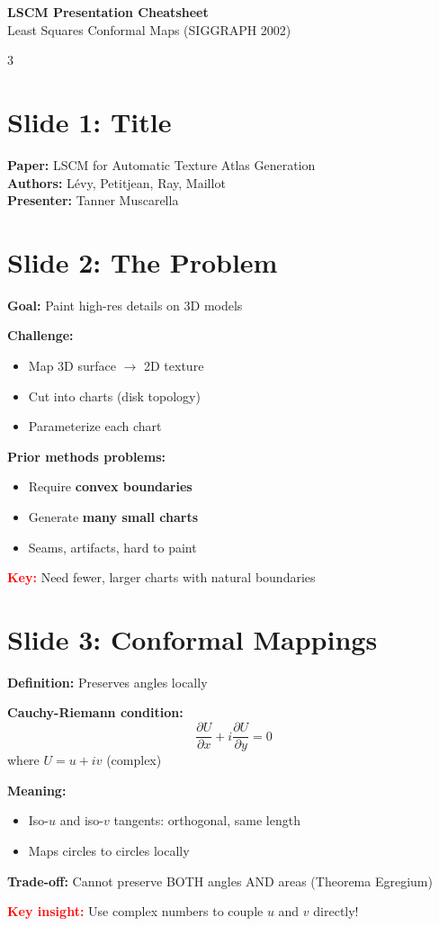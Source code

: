 \documentclass[10pt,landscape]{article}
\newcommand{\slide}[1]{\section*{Slide #1}}
\begin{document}
\begin{center}
\Large\textbf{LSCM Presentation Cheatsheet}\\
\normalsize Least Squares Conformal Maps (SIGGRAPH 2002)
\end{center}

\begin{multicols}{3}
\small

\slide{1: Title}
\textbf{Paper:} LSCM for Automatic Texture Atlas Generation\\
\textbf{Authors:} Lévy, Petitjean, Ray, Maillot\\
\textbf{Presenter:} Tanner Muscarella

\slide{2: The Problem}
\textbf{Goal:} Paint high-res details on 3D models

\textbf{Challenge:}
\begin{itemize}
\item Map 3D surface $\rightarrow$ 2D texture
\item Cut into charts (disk topology)
\item Parameterize each chart
\end{itemize}

\textbf{Prior methods problems:}
\begin{itemize}
\item Require \textbf{convex boundaries}
\item Generate \textbf{many small charts}
\item Seams, artifacts, hard to paint
\end{itemize}

\textcolor{red}{\textbf{Key:}} Need fewer, larger charts with natural boundaries

\slide{3: Conformal Mappings}
\textbf{Definition:} Preserves angles locally

\textbf{Cauchy-Riemann condition:}
\[
\frac{\partial U}{\partial x} + i \frac{\partial U}{\partial y} = 0
\]
where $U = u + iv$ (complex)

\textbf{Meaning:}
\begin{itemize}
\item Iso-$u$ and iso-$v$ tangents: orthogonal, same length
\item Maps circles to circles locally
\end{itemize}

\textbf{Trade-off:} Cannot preserve BOTH angles AND areas (Theorema Egregium)

\textcolor{red}{\textbf{Key insight:}} Use complex numbers to couple $u$ and $v$ directly!


\end{multicols}
\end{document}
